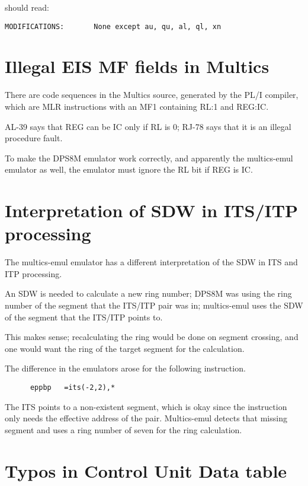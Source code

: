 \documentclass[notitlepage]{report}
\begin{document}
should read:

\begin{verbatim}
MODIFICATIONS:       None except au, qu, al, ql, xn
\end{verbatim}

\section{Illegal EIS MF fields in Multics}

There are code sequences in the Multics source, generated by the PL/I compiler,
which are MLR instructions with an MF1 containing RL:1 and REG:IC.

AL-39 says that REG can be IC only if RL is 0; RJ-78 says that it is an illegal procedure fault.

To make the DPS8M emulator work correctly, and apparently the multics-emul emulator as well, 
the emulator must ignore the RL bit if REG is IC.

\section{Interpretation of SDW in ITS/ITP processing}

The multics-emul emulator has a different interpretation of the SDW in ITS and ITP 
processing.

An SDW is needed to calculate a new ring number; DPS8M was using the ring number of the segment that the ITS/ITP pair was in; multics-emul uses the SDW of the segment that the ITS/ITP points to.

This makes sense; recalculating the ring would be done on segment crossing, and 
one would want the ring of the target segment for the calculation.

The difference in the emulators arose for the following instruction.

\begin{verbatim}
      eppbp   =its(-2,2),*
\end{verbatim}

The ITS points to a non-existent segment, which is okay since the instruction only needs the
effective address of the pair. Multics-emul detects that missing segment and uses a ring
number of seven for the ring calculation.

\section{Typos in Control Unit Data table}
\end{document}
